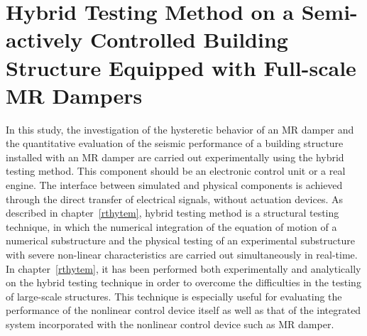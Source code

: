 \chapter{Hybrid Testing Method on a Semi-actively Controlled Building Structure Equipped with Full-scale MR Dampers}
\label{chap:rthytem-mrdamper}

In this study, the investigation of the hysteretic behavior of an MR damper and the quantitative evaluation of the seismic performance of a building structure installed with an MR damper are carried out experimentally using the hybrid testing method. This component should be an electronic control unit or a real engine. The interface between simulated and physical components is achieved through the direct transfer of electrical signals, without actuation devices\citep{christenson2008large}. As described in chapter~\ref{rthytem}, hybrid testing method is a structural testing technique, in which the numerical integration of the equation of motion of a numerical substructure and the physical testing of an experimental substructure with severe non-linear characteristics are carried out simultaneously in real-time. In chapter~\ref{rthytem}, it has been performed both experimentally and analytically on the hybrid testing technique in order to overcome the difficulties in the testing of large-scale structures. This technique is especially useful for evaluating the performance of the nonlinear control device itself as well as that of the integrated system incorporated with the nonlinear control device such as MR damper.

